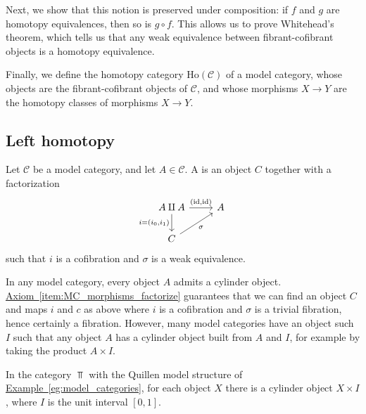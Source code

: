 \documentclass[main.tex]{subfiles}
\begin{document}
Next, we show that this notion is preserved under composition: if $f$ and $g$ are homotopy equivalences, then so is $g \circ f$. This allows us to prove Whitehead's theorem, which tells us that any weak equivalence between fibrant-cofibrant objects is a homotopy equivalence.

Finally, we define the homotopy category $\mathrm{Ho}(\mathcal{C})$ of a model category, whose objects are the fibrant-cofibrant objects of $\mathcal{C}$, and whose morphisms $X \to Y$ are the homotopy classes of morphisms $X \to Y$.

\subsection{Left homotopy}
\label{ssc:left_homotopy}

\begin{definition}
  \label{def:cylinder_object}
  Let $\mathcal{C}$ be a model category, and let $A \in \mathcal{C}$. A  is an object $C$ together with a factorization
  \begin{equation*}
    \begin{tikzcd}
      A \amalg A
      \arrow[r, "{(\id, \id)}"]
      \arrow[d, swap, "{i = (i_{0}, i_{1})}"]
      & A
      \\
      C
      \arrow[ur, swap, "\sigma"]
    \end{tikzcd}
  \end{equation*}
  such that $i$ is a cofibration and $\sigma$ is a weak equivalence.
\end{definition}

In any model category, every object $A$ admits a cylinder object. \hyperref[item:MC_morphisms_factorize]{Axiom~\ref*{item:MC_morphisms_factorize}} guarantees that we can find an object $C$ and maps $i$ and $c$ as above where $i$ is a cofibration and $\sigma$ is a trivial fibration, hence certainly a fibration. However, many model categories have an object such $I$ such that any object $A$ has a cylinder object built from $A$ and $I$, for example by taking the product $A \times I$.

\begin{example}
  \label{eg:cylinder_objects_in_top}
  In the category $\Top$ with the Quillen model structure of \hyperref[eg:model_categories]{Example~\ref*{eg:model_categories}}, for each object $X$ there is a cylinder object $X \times I$, where $I$ is the unit interval $[0, 1]$.
\end{example}
\end{document}
